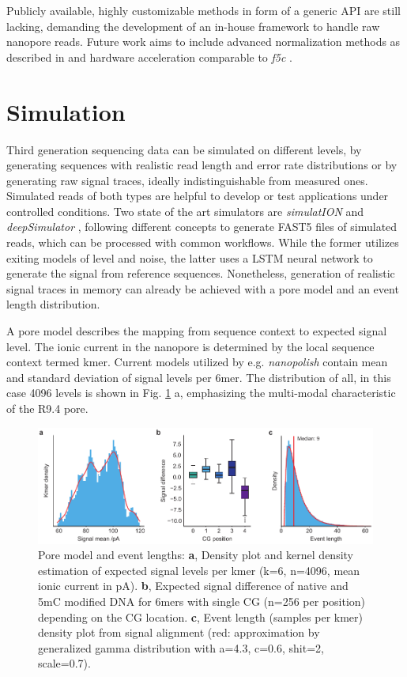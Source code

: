 Publicly available, highly customizable methods in form of a generic API are still lacking, demanding the development of an in-house framework to handle raw nanopore reads. Future work aims to include advanced normalization methods as described in \cite{Boza2017} and hardware acceleration comparable to \textit{f5c} \cite{Gamaarachchi2020}.




\section{Simulation}
\label{sec:signal:simulation}

Third generation sequencing data can be simulated on different levels, by generating sequences with realistic read length and error rate distributions or by generating raw signal traces, ideally indistinguishable from measured ones. Simulated reads of both types are helpful to develop or test applications under controlled conditions. Two state of the art simulators are \textit{simulatION} \cite{Rohrandt2018} and \textit{deepSimulator} \cite{Li2020}, following different concepts to generate FAST5 files of simulated reads, which can be processed with common workflows. While the former utilizes exiting models of level and noise, the latter uses a LSTM neural network to generate the signal from reference sequences. Nonetheless, generation of realistic signal traces in memory can already be achieved with a pore model and an event length distribution.

A pore model describes the mapping from sequence context to expected signal level. The ionic current in the nanopore is determined by the local sequence context termed kmer. Current models utilized by e.g. \textit{nanopolish} contain mean and standard deviation of signal levels per 6mer. The distribution of all, in this case 4096 levels is shown in Fig. \ref{fig:signal:pm} a, emphasizing the multi-modal characteristic of the R9.4 pore.

\begin{figure}[h]
	\centering
	\includegraphics[width=1.0\textwidth]{figures/signal/pm.pdf}
	\captionsetup{format=plain}
	\caption[Pore model and event length]{Pore model and event lengths: \textbf{a}, Density plot and kernel density estimation of expected signal levels per kmer (k=6, n=4096, mean ionic current in pA). \textbf{b}, Expected signal difference of native and 5mC modified DNA for 6mers with single CG (n=256 per position) depending on the CG location. \textbf{c}, Event length (samples per kmer) density plot from signal alignment (red: approximation by generalized gamma distribution with a=4.3, c=0.6, shit=2, scale=0.7).}
	\label{fig:signal:pm}
\end{figure}

